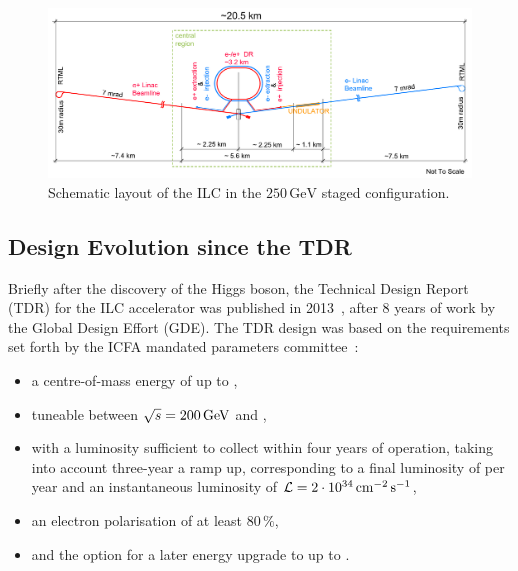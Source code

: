 \begin{figure}[tb]
 \begin{center}
 \includegraphics[width=\hsize]{chapters/figures/TDR-machine-layout-cartoon-staged-mirror.pdf}
\caption{Schematic layout of the ILC in the $250\,{\mathrm{GeV}}$ staged configuration.
\label{fig_ilc-schematic}}
 \end{center}
 \end{figure}

\subsection{Design Evolution since the TDR}
\label{sec:design_evo}

Briefly after the discovery of the Higgs boson, the Technical Design Report (TDR) for the ILC accelerator was published in 2013~\cite{Adolphsen:2013jya,Adolphsen:2013kya}, after 8 years of work by the Global Design Effort (GDE).
The TDR design was based on the requirements set forth by the ICFA mandated parameters committee~\cite{Heuer:2006}:
\begin{itemize}
\item a centre-of-mass energy of up to ,
\item tuneable between $\sqrt{s} = 200\,{\mathrm{GeV}}$ and ,
\item with a luminosity sufficient to collect  within four years of operation, taking into account three-year a ramp up, corresponding to a final luminosity of  per year and an instantaneous luminosity of ${\mathcal{L}} = 2 \cdot 10^{34}\,{\mathrm{cm^{-2}\,s^{-1}}}$,
\item an electron polarisation of at least $80\,\%$,
\item and the option for a later energy upgrade to up to .
\end{itemize}

